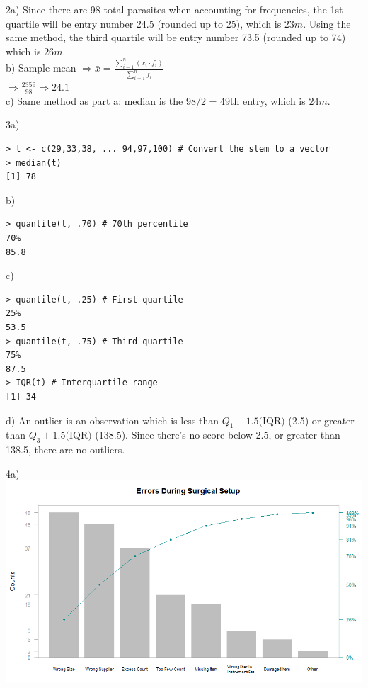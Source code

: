 \documentclass[12pt]{report}
\begin{document}
\hrulefill
\bigskip

\noindent 2a) Since there are 98 total parasites when accounting for frequencies, the 1st quartile will be entry number 24.5 (rounded up to 25), which is $\boxed{23m.}$ Using the same method, the third quartile will be entry number 73.5 (rounded up to 74) which is $\boxed{26m.}$\\

\noindent b) Sample mean $\Rightarrow \bar{x} = \frac{\sum_{i=1}^n(x_i \cdot f_i)}{\sum_{i=1}^n{f_i}}$\\
$\Rightarrow \frac{2359}{98} \Rightarrow \boxed{24.1}$\\

\noindent c) Same method as part a: median is the 98/2 = 49th entry, which is $\boxed{24m.}$\\

\clearpage

\noindent 3a) 
\begin{verbatim}
> t <- c(29,33,38, ... 94,97,100) # Convert the stem to a vector
> median(t)
[1] 78
\end{verbatim}

\noindent b)
\begin{verbatim}
> quantile(t, .70) # 70th percentile
70% 
85.8
\end{verbatim}
\noindent c)
\begin{verbatim}
> quantile(t, .25) # First quartile
25% 
53.5 
> quantile(t, .75) # Third quartile
75% 
87.5 
> IQR(t) # Interquartile range
[1] 34
\end{verbatim}

\noindent d) An outlier is an observation which is less than $Q_1 - 1.5($IQR$)$ (2.5) or greater than $Q_3 + 1.5($IQR$)$ (138.5). Since there's no score below 2.5, or greater than 138.5, there are no outliers.\\

\clearpage

\noindent 4a) \\\includegraphics[scale=0.6]{4pareto} 
\end{document}

